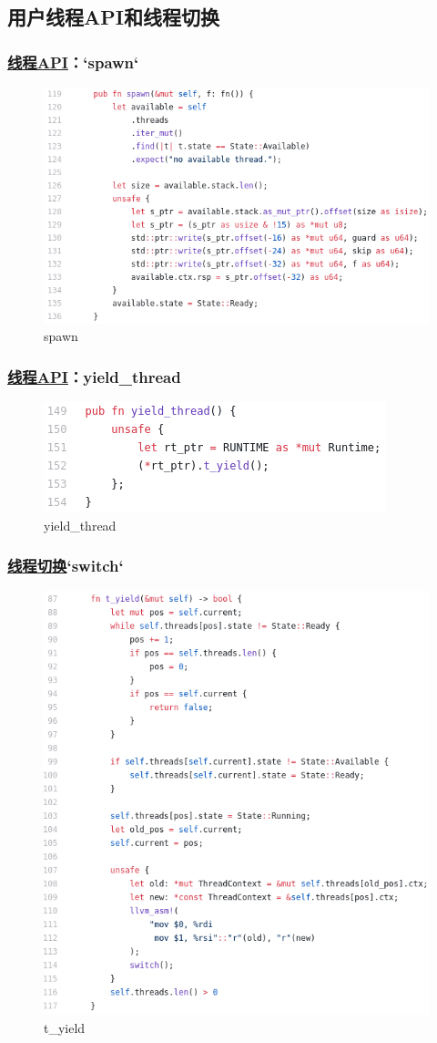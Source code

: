 \subsection{用户线程API和线程切换}
\begin{frame}[fragile]
    \frametitle{\href{https://github.com/cfsamson/example-greenthreads/blob/master/src/main.rs\#L119}{线程API}：`spawn`}
% 
	\begin{figure}
		\centering
		\includegraphics[width=0.5\linewidth]{figs/spawn.png}
		\caption{spawn}
	\end{figure}


% 
\end{frame}
\begin{frame}[fragile]
    \frametitle{\href{https://github.com/cfsamson/example-greenthreads/blob/master/src/main.rs\#L119}{线程API}：yield_thread}
% 
	\begin{figure}
		\centering
		\includegraphics[width=0.5\linewidth]{figs/yield_thread.png}
		\caption{yield_thread}
	\end{figure}


% 
\end{frame}
\begin{frame}[fragile]
    \frametitle{\href{https://github.com/cfsamson/example-greenthreads/blob/master/src/main.rs\#L158}{线程切换}`switch`}
% 
	\begin{figure}
		\centering
		\includegraphics[width=0.5\linewidth]{figs/t_yield.png}
		\caption{t_yield}
	\end{figure}


% 
\end{frame}

